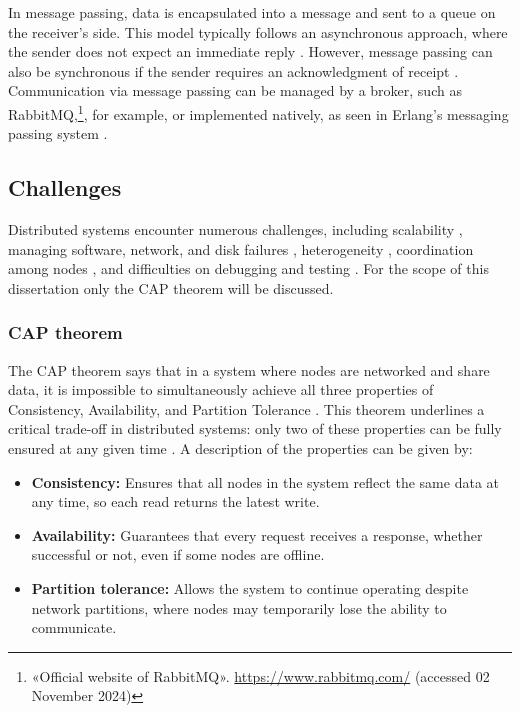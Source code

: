In message passing, data is encapsulated into a message and sent to a queue on the receiver’s side. This model typically follows an asynchronous approach, where the sender does not expect an immediate reply \cite{Kleppmann2017, Coulouris2012}. However, message passing can also be synchronous if the sender requires an acknowledgment of receipt \cite{Coulouris2012}. Communication via message passing can be managed by a broker, such as RabbitMQ,\footnote{«Official website of RabbitMQ». \url{https://www.rabbitmq.com/} (accessed 02 November 2024)}, for example, or implemented natively, as seen in Erlang’s messaging passing system \cite{Nystrom2009, Tanenbaum2023}.

\subsection{Challenges}

Distributed systems encounter numerous challenges, including scalability \cite{Ahmed2013}, managing software, network, and disk failures \cite{Naik2021, aws-challenges-dist-sys}, heterogeneity \cite{Coulouris2012}, coordination among nodes \cite{Vitillo2021}, and difficulties on debugging and testing \cite{Beschastnikh2020, aws-challenges-dist-sys}. For the scope of this dissertation only the CAP theorem will be discussed.

\subsubsection{CAP theorem}

The CAP theorem says that in a system where nodes are networked and share data, it is impossible to simultaneously achieve all three properties of Consistency, Availability, and Partition Tolerance \cite{Tanenbaum2023, Vitillo2021}. This theorem underlines a critical trade-off in distributed systems: only two of these properties can be fully ensured at any given time \cite{ibm-cap-theorem, Gilbert2012}. A description of the properties can be given by:

\begin{itemize}
	\item \textbf{Consistency:} Ensures that all nodes in the system reflect the same data at any time, so each read returns the latest write.
	\item \textbf{Availability:} Guarantees that every request receives a response, whether successful or not, even if some nodes are offline.
	\item \textbf{Partition tolerance:} Allows the system to continue operating despite network partitions, where nodes may temporarily lose the ability to communicate.
\end{itemize}

